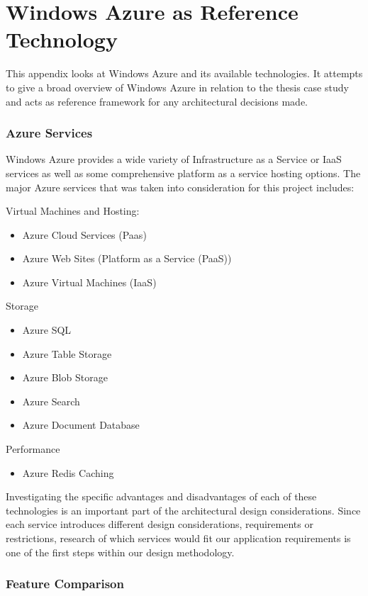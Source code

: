 \chapter{Windows Azure as Reference Technology}
\label{appendix:azure}
This appendix looks at Windows Azure and its available technologies. It attempts to give a broad overview of Windows Azure in relation to the thesis case study and acts as reference framework for any architectural decisions made.

\subsection{Azure Services}

Windows Azure provides a wide variety of Infrastructure as a Service or IaaS services as well as some comprehensive platform as a service hosting options. The major Azure services that was taken into consideration for this project includes:

Virtual Machines and Hosting:
\begin{itemize}
\item Azure Cloud Services (Paas)
\item Azure Web Sites (Platform as a Service (PaaS))
\item Azure Virtual Machines (IaaS)
\end{itemize}

Storage
\begin{itemize}
\item Azure SQL
\item Azure Table Storage
\item Azure Blob Storage
\item Azure Search
\item Azure Document Database
\end{itemize}

Performance
\begin{itemize}
\item Azure Redis Caching
\end{itemize}

Investigating the specific advantages and disadvantages of each of these technologies is an important part of the architectural design considerations. Since each service introduces different design considerations, requirements or restrictions, research of which services would fit our application requirements is one of the first steps within our design methodology.

\subsection{Feature Comparison}

